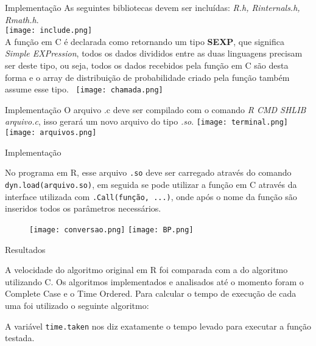 \documentclass{beamer}
\begin{document}
\begin{frame}{Implementação}
 As seguintes bibliotecas devem ser incluídas: \textit{R.h, Rinternals.h, Rmath.h}. \\
 \vspace{0.3cm}
 \texttt{[image: include.png]}\\
 
 A função em C é declarada como retornando um tipo \textbf{SEXP}, que significa \textit{Simple EXPression}, todos os dados divididos entre as duas linguagens precisam ser deste tipo, ou seja, todos os dados recebidos pela função em C são desta forma e o array de distribuição de probabilidade criado pela função também assume esse tipo.~\cite{.Call,Extensions}
 \vspace{0.3cm}
 \texttt{[image: chamada.png]}\\
     
\end{frame}

\begin{frame}{Implementação}
O arquivo .c deve ser compilado com o comando \textit{R CMD SHLIB arquivo.c}, isso gerará um novo arquivo do tipo \textit{.so}.
\vspace{0.3cm}    
\texttt{[image: terminal.png]}\\
\vspace{0.3cm}
\texttt{[image: arquivos.png]}\\
\vspace{0.3cm}
\end{frame}

\begin{frame}{Implementação}

 No programa em R, esse arquivo \texttt{.so} deve ser carregado através do comando \texttt{dyn.load(arquivo.so)}, em seguida se pode utilizar a função em C através da interface utilizada com \texttt{.Call(função, ...)}, onde após o nome da função são inseridos todos os parâmetros necessários.\\

\begin{figure}[h]
\texttt{[image: conversao.png]}
\texttt{[image: BP.png]}
\end{figure}
\end{frame}

\begin{frame}{Resultados}

A velocidade do algoritmo original em R foi comparada com a do algoritmo utilizando C. Os algoritmos implementados e analisados até o momento foram o Complete Case e o Time Ordered. Para calcular o tempo de execução de cada uma foi utilizado o seguinte algoritmo:



A variável \texttt{time.taken} nos diz exatamente o tempo levado para executar a função testada.
    
\end{frame}
\end{document}

